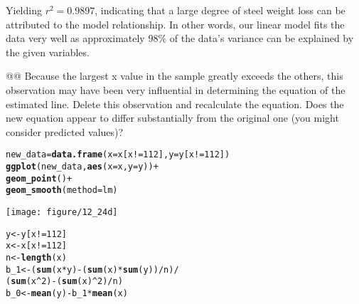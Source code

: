 \documentclass[10pt]{article}\usepackage[]{graphicx}\usepackage[]{xcolor}
\makeatletter
\def\maxwidth{ %
  \ifdim\Gin@nat@width>\linewidth
    \linewidth
  \else
    \Gin@nat@width
  \fi
}
\newcommand{\hlnum}[1]{\textcolor[rgb]{0.686,0.059,0.569}{#1} }%
\newcommand{\hlopt}[1]{\textcolor[rgb]{0,0,0}{#1} }%
\newcommand{\hlstd}[1]{\textcolor[rgb]{0.345,0.345,0.345}{#1} }%
\newcommand{\hlkwb}[1]{\textcolor[rgb]{0.69,0.353,0.396}{#1} }%
\newcommand{\hlkwc}[1]{\textcolor[rgb]{0.333,0.667,0.333}{#1} }%
\newcommand{\hlkwd}[1]{\textcolor[rgb]{0.737,0.353,0.396}{\textbf{#1} } }%
\newenvironment{kframe}{%
 \def\at@end@of@kframe{}%
 \ifinner\ifhmode%
  \def\at@end@of@kframe{\end{minipage} }%
  \begin{minipage}{\columnwidth}%
 \fi\fi%
 \def\FrameCommand##1{\hskip\@totalleftmargin \hskip-\fboxsep
 \colorbox{shadecolor}{##1}\hskip-\fboxsep
     \hskip-\linewidth \hskip-\@totalleftmargin \hskip\columnwidth}%
 \MakeFramed {\advance\hsize-\width
   \@totalleftmargin\z@ \linewidth\hsize
   \@setminipage} }%
 {\par\unskip\endMakeFramed%
 \at@end@of@kframe}
\newenvironment{knitrout}{}{} %
\makeatother
\begin{document}
\begin{easylist}[enumerate]
    Yielding $r^2 = 0.9897$, indicating that a large degree of steel weight loss can be attributed to the model
    relationship. In other words, our linear model fits the data very well as approximately $98\%$ of the data's
    variance can be explained by the given variables.

    @@ Because the largest x value in the sample greatly exceeds the others, this observation may have been very
    influential in determining the equation of the estimated line. Delete this observation and recalculate the equation.
    Does the new equation appear to differ substantially from the original one (you might consider predicted values)?

\begin{knitrout}
\color{fgcolor}\begin{kframe}
\begin{alltt}
         \hlstd{new_data} \hlkwb{=} \hlkwd{data.frame}\hlstd{(}\hlkwc{x}\hlstd{=x[x} \hlopt{!=} \hlnum{112}\hlstd{],} \hlkwc{y}\hlstd{=y[x} \hlopt{!=} \hlnum{112}\hlstd{])}
         \hlkwd{ggplot}\hlstd{(new_data,} \hlkwd{aes}\hlstd{(}\hlkwc{x}\hlstd{=x,} \hlkwc{y}\hlstd{=y))} \hlopt{+}
             \hlkwd{geom_point}\hlstd{()} \hlopt{+}
             \hlkwd{geom_smooth}\hlstd{(}\hlkwc{method}\hlstd{=lm)}
\end{alltt}
\end{kframe}

{\centering \texttt{[image: figure/12\_24d]} 

}


\begin{kframe}\begin{alltt}
         \hlstd{y} \hlkwb{<-} \hlstd{y[x} \hlopt{!=} \hlnum{112}\hlstd{]}
         \hlstd{x} \hlkwb{<-} \hlstd{x[x} \hlopt{!=} \hlnum{112}\hlstd{]}
         \hlstd{n} \hlkwb{<-} \hlkwd{length}\hlstd{(x)}
         \hlstd{b_1} \hlkwb{<-} \hlstd{(}\hlkwd{sum}\hlstd{(x} \hlopt{*} \hlstd{y)} \hlopt{-} \hlstd{(}\hlkwd{sum}\hlstd{(x)} \hlopt{*} \hlkwd{sum}\hlstd{(y))}\hlopt{/}\hlstd{n)} \hlopt{/}
                 \hlstd{(}\hlkwd{sum}\hlstd{(x}\hlopt{^}\hlnum{2}\hlstd{)} \hlopt{-} \hlstd{(}\hlkwd{sum}\hlstd{(x)}\hlopt{^}\hlnum{2}\hlstd{)}\hlopt{/}\hlstd{n)}
         \hlstd{b_0} \hlkwb{<-} \hlkwd{mean}\hlstd{(y)} \hlopt{-} \hlstd{b_1} \hlopt{*} \hlkwd{mean}\hlstd{(x)}
\end{alltt}
\end{kframe}
\end{knitrout}



\end{easylist}
\end{document}
